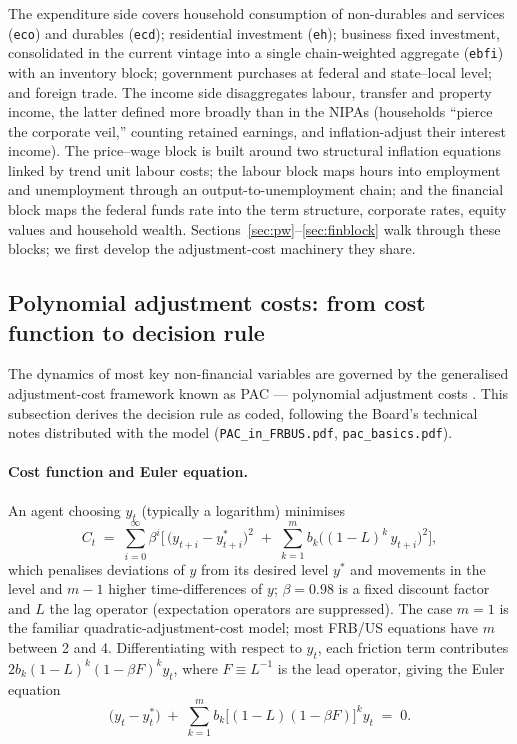 The expenditure side covers household consumption of non-durables and services (\texttt{eco}) and durables (\texttt{ecd}); residential investment (\texttt{eh}); business fixed investment, consolidated in the current vintage into a single chain-weighted aggregate (\texttt{ebfi}) with an inventory block; government purchases at federal and state--local level; and foreign trade. The income side disaggregates labour, transfer and property income, the latter defined more broadly than in the NIPAs (households ``pierce the corporate veil,'' counting retained earnings, and inflation-adjust their interest income). The price--wage block is built around two structural inflation equations linked by trend unit labour costs; the labour block maps hours into employment and unemployment through an output-to-unemployment chain; and the financial block maps the federal funds rate into the term structure, corporate rates, equity values and household wealth. Sections~\ref{sec:pw}--\ref{sec:finblock} walk through these blocks; we first develop the adjustment-cost machinery they share.

\subsection{Polynomial adjustment costs: from cost function to decision rule}
\label{sec:pac}

The dynamics of most key non-financial variables are governed by the generalised adjustment-cost framework known as PAC --- polynomial adjustment costs \citep{tinsley1993, tinsley2002}. This subsection derives the decision rule as coded, following the Board's technical notes distributed with the model (\texttt{PAC\_in\_FRBUS.pdf}, \texttt{pac\_basics.pdf}).

\paragraph{Cost function and Euler equation.} An agent choosing $y_t$ (typically a logarithm) minimises
\begin{equation}
C_t \;=\; \sum_{i=0}^{\infty} \beta^{i}\Big[\,\big(y_{t+i}-y^{*}_{t+i}\big)^{2} \;+\; \sum_{k=1}^{m} b_k\big((1-L)^{k}\,y_{t+i}\big)^{2}\Big],
\label{eq:pac-cost}
\end{equation}
which penalises deviations of $y$ from its desired level $y^{*}$ and movements in the level and $m-1$ higher time-differences of $y$; $\beta=0.98$ is a fixed discount factor and $L$ the lag operator (expectation operators are suppressed). The case $m=1$ is the familiar quadratic-adjustment-cost model; most FRB/US equations have $m$ between 2 and 4. Differentiating with respect to $y_t$, each friction term contributes $2b_k(1-L)^k(1-\beta F)^k y_t$, where $F\equiv L^{-1}$ is the lead operator, giving the Euler equation
\begin{equation}
\big(y_t - y^{*}_t\big) \;+\; \sum_{k=1}^{m} b_k\big[(1-L)(1-\beta F)\big]^{k} y_t \;=\; 0.
\label{eq:pac-euler}
\end{equation}

